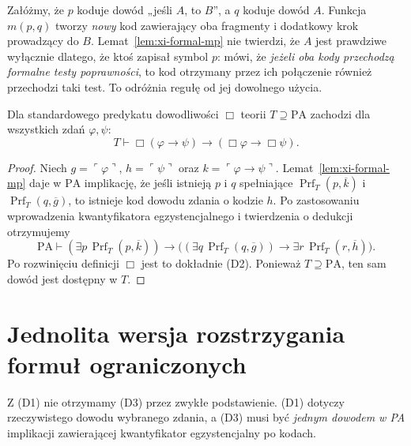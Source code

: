 \begin{przyklad}
Załóżmy, że $p$ koduje dowód „jeśli $A$, to $B$”,
a $q$ koduje dowód $A$. Funkcja $m(p,q)$ tworzy
\emph{nowy} kod zawierający oba fragmenty i dodatkowy
krok prowadzący do $B$. Lemat~\ref{lem:xi-formal-mp}
nie twierdzi, że $A$ jest prawdziwe wyłącznie dlatego,
że ktoś zapisał symbol $p$: mówi, że \emph{jeżeli oba
kody przechodzą formalne testy poprawności}, to
kod otrzymany przez ich połączenie również przechodzi
taki test. To odróżnia regułę od jej dowolnego użycia.
\end{przyklad}

\begin{twierdzenie}[Warunek (D2)]\label{thm:xi-d2}
Dla standardowego predykatu dowodliwości $\Box$
teorii $T\supseteq\mathrm{PA}$ zachodzi dla
wszystkich zdań $\varphi,\psi$:
\[
T\vdash\Box(\varphi\to\psi)\to
(\Box\varphi\to\Box\psi).
\]
\end{twierdzenie}
\begin{proof}
Niech $g=\ulcorner\varphi\urcorner$,
$h=\ulcorner\psi\urcorner$ oraz
$k=\ulcorner\varphi\to\psi\urcorner$.
Lemat~\ref{lem:xi-formal-mp} daje w $\mathrm{PA}$
implikację, że jeśli istnieją $p$ i $q$ spełniające
$\operatorname{Prf}_T(p,\overline k)$ i
$\operatorname{Prf}_T(q,\overline g)$, to
istnieje kod dowodu zdania o kodzie $h$.
Po zastosowaniu wprowadzenia kwantyfikatora egzystencjalnego
i twierdzenia o dedukcji otrzymujemy
\[
\mathrm{PA}\vdash
(\exists p\,\operatorname{Prf}_T(p,\overline k))\to
\bigl((\exists q\,\operatorname{Prf}_T(q,\overline g))\to
\exists r\,\operatorname{Prf}_T(r,\overline h)\bigr).
\]
Po rozwinięciu definicji $\Box$ jest to dokładnie (D2).
Ponieważ $T\supseteq\mathrm{PA}$, ten sam dowód
jest dostępny w $T$.
\end{proof}

\section{Jednolita wersja rozstrzygania formuł ograniczonych}
Z (D1) nie otrzymamy (D3) przez zwykłe podstawienie.
(D1) dotyczy rzeczywistego dowodu wybranego zdania,
a (D3) musi być \emph{jednym dowodem w PA} implikacji
zawierającej kwantyfikator egzystencjalny po kodach.


